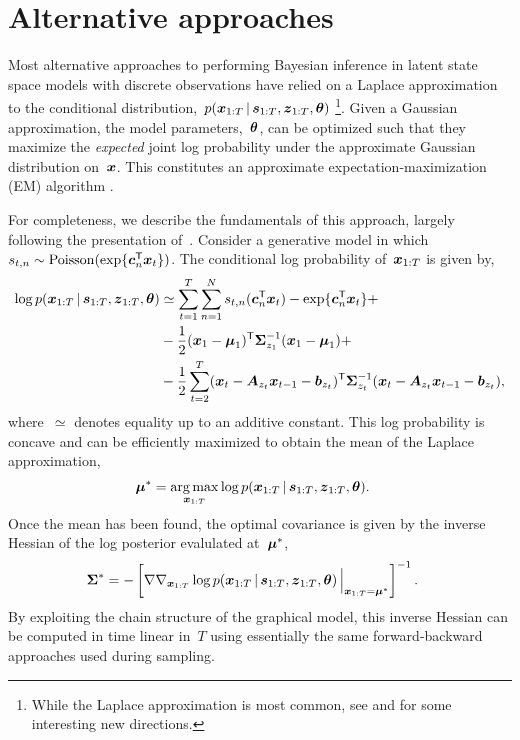 \section{Alternative approaches}
Most alternative approaches to performing Bayesian inference in latent
state space models with discrete observations have relied on a Laplace
approximation \citep{tierney1986accurate} to the conditional
distribution,~${p(\boldsymbol{x}_{1:T} \,|\, \boldsymbol{s}_{1:T}, \boldsymbol{z}_{1:T}, \boldsymbol{\theta})}$
\citep{Smith-2003, paninski2010new, macke2011empirical}
\footnote{While the Laplace approximation is most common, see 
  \citet{buesing2012spectral} and \citet{pfau2013robust} for some
  interesting new directions.}. Given a
Gaussian approximation, the model parameters,~$\boldsymbol{\theta}$, can be
optimized such that they maximize the \emph{expected} joint log
probability under the approximate Gaussian distribution on~$\boldsymbol{x}$. This
constitutes an approximate expectation-maximization (EM) algorithm
\citep{dempster1977maximum}.

\sloppy
For completeness, we describe the fundamentals of this approach,
largely following the presentation of~\citet{macke2011empirical}.
Consider a generative model in which~${s_{t,n} \sim \mathrm{Poisson}(\exp\{\boldsymbol{c}_n^{\mathsf{T}} \boldsymbol{x}_t\})}$.  The conditional log probability of~$\boldsymbol{x}_{1:T}$ is
given by,
\begin{align*}
  \log p(\boldsymbol{x}_{1:T} \,|\, \boldsymbol{s}_{1:T}, \boldsymbol{z}_{1:T}, \boldsymbol{\theta})
  &\simeq \sum_{t=1}^T \sum_{n=1}^N s_{t,n} (\boldsymbol{c}_{n}^{\mathsf{T}} \boldsymbol{x}_{t}) - \exp\{\boldsymbol{c}_n^{\mathsf{T}}\boldsymbol{x}_{t}\} + \\
  &-\frac{1}{2} (\boldsymbol{x}_1 - \boldsymbol{\mu}_1)^{\mathsf{T}} \boldsymbol{\Sigma}_{z_1}^{-1} (\boldsymbol{x}_1 - \boldsymbol{\mu}_1) + \\
  &-\frac{1}{2} \sum_{t=2}^T (\boldsymbol{x}_t - \boldsymbol{A}_{z_t} \boldsymbol{x}_{t-1} - \boldsymbol{b}_{z_t})^{\mathsf{T}}
  \boldsymbol{\Sigma}_{z_t}^{-1} (\boldsymbol{x}_t - \boldsymbol{A}_{z_t} \boldsymbol{x}_{t-1} - \boldsymbol{b}_{z_t}),
\end{align*}
where~$\simeq$ denotes equality up to an additive constant.
This log probability is concave and can be efficiently maximized to
obtain the mean of the Laplace approximation,
\begin{align*}
  \bmu^* &= \argmax_{\bx_{1:T}}
  \log p(\bx_{1:T} \given \bs_{1:T}, \bz_{1:T}, \btheta).
\end{align*}
Once the mean has been found, the optimal covariance is given by
the inverse Hessian of the log posterior evalulated at~$\boldsymbol{\mu}^*$,
\begin{align*}
  \boldsymbol{\Sigma}^* &= - \left[ \nabla \nabla_{\boldsymbol{x}_{1:T}}
      \log p(\boldsymbol{x}_{1:T} \,|\, \boldsymbol{s}_{1:T}, \boldsymbol{z}_{1:T}, \boldsymbol{\theta}) \, \Big|_{\boldsymbol{x}_{1:T}=\boldsymbol{\mu}^*} \right]^{-1}.
\end{align*}
By exploiting the chain structure of the graphical model, this
inverse Hessian can be computed in time linear in~$T$ using essentially
the same forward-backward approaches used during sampling.

